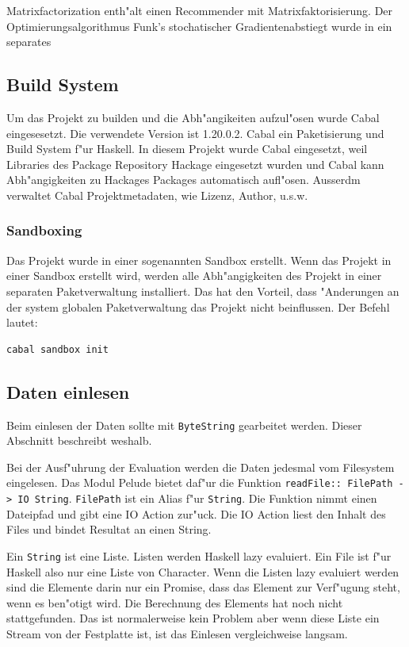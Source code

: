 \documentclass[a4paper, 12pt]{article}
\begin{document}
Matrixfactorization enth"alt einen Recommender mit Matrixfaktorisierung. Der Optimierungsalgorithmus Funk's stochatischer Gradientenabstiegt wurde in ein separates 

\subsection{Build System}
\label{sec:cabal}

Um das Projekt zu builden und die Abh"angikeiten aufzul"osen wurde Cabal eingesesetzt. Die verwendete Version ist 1.20.0.2. Cabal ein Paketisierung und Build System f"ur Haskell. In diesem Projekt wurde Cabal eingesetzt, weil Libraries des Package Repository Hackage eingesetzt wurden und Cabal kann Abh"angigkeiten zu Hackages Packages automatisch aufl"osen. Ausserdm verwaltet Cabal Projektmetadaten, wie Lizenz, Author, u.s.w.

\subsubsection{Sandboxing}
\label{sec:sanboxing}

Das Projekt wurde in einer sogenannten Sandbox erstellt. Wenn das Projekt in einer Sandbox erstellt wird, werden alle Abh"angigkeiten des Projekt in einer separaten Paketverwaltung installiert. Das hat den Vorteil, dass "Anderungen an der system globalen Paketverwaltung das Projekt nicht beinflussen. Der Befehl lautet:
\begin{verbatim}
cabal sandbox init
\end{verbatim}

\subsection{Daten einlesen}
\label{sec:readio}

Beim einlesen der Daten sollte mit \verb|ByteString| gearbeitet werden. Dieser Abschnitt beschreibt weshalb.

Bei der Ausf"uhrung der Evaluation werden die Daten jedesmal vom Filesystem eingelesen. Das Modul Pelude bietet daf"ur die Funktion \verb|readFile:: FilePath -> IO String|. \verb|FilePath| ist ein Alias f"ur \verb|String|. Die Funktion nimmt einen Dateipfad und gibt eine IO Action zur"uck. Die IO Action liest den Inhalt des Files und bindet Resultat an einen String.

Ein \verb|String| ist eine Liste. Listen werden Haskell lazy evaluiert. Ein File ist f"ur Haskell also nur eine Liste von Character. Wenn die Listen lazy evaluiert werden sind die Elemente darin nur ein Promise, dass das Element zur Verf"ugung steht, wenn es ben"otigt wird. Die Berechnung des Elements hat noch nicht stattgefunden. Das ist normalerweise kein Problem aber wenn diese Liste ein Stream von der Festplatte ist, ist das Einlesen vergleichweise langsam.
\end{document}
